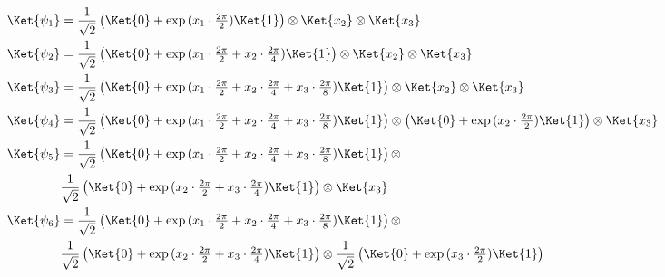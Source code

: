 \begin{align*}
    \Ket{\psi_1} & = \frac{1}{\sqrt{2}}\begin{pmatrix}\Ket{0} + \exp{(x_1\cdot\frac{2\pi}{2})}\Ket{1}\end{pmatrix} \otimes \Ket{x_2} \otimes \Ket{x_3}
    \\
    \Ket{\psi_2} & =  \frac{1}{\sqrt{2}}\begin{pmatrix}\Ket{0} + \exp{(x_1\cdot\frac{2\pi}{2} + x_2\cdot\frac{2\pi}{4})}\Ket{1}\end{pmatrix} \otimes \Ket{x_2} \otimes \Ket{x_3}
    \\
    \Ket{\psi_3} & =  \frac{1}{\sqrt{2}}\begin{pmatrix}\Ket{0} + \exp{(x_1\cdot\frac{2\pi}{2} + x_2\cdot\frac{2\pi}{4} + x_3\cdot\frac{2\pi}{8})}\Ket{1}\end{pmatrix} \otimes \Ket{x_2} \otimes \Ket{x_3}                                                                            \\
    \Ket{\psi_4} & =  \frac{1}{\sqrt{2}}\begin{pmatrix}\Ket{0} + \exp{(x_1\cdot\frac{2\pi}{2} + x_2\cdot\frac{2\pi}{4} + x_3\cdot\frac{2\pi}{8})}\Ket{1}\end{pmatrix}  \otimes \begin{pmatrix}\Ket{0} + \exp{(x_2\cdot\frac{2\pi}{2})}\Ket{1}\end{pmatrix} \otimes \Ket{x_3}
    \\
    \Ket{\psi_5} & =  \frac{1}{\sqrt{2}}\begin{pmatrix}\Ket{0} + \exp{(x_1\cdot\frac{2\pi}{2} + x_2\cdot\frac{2\pi}{4} + x_3\cdot\frac{2\pi}{8})}\Ket{1}\end{pmatrix} \otimes                                                                                                        \\ & \frac{1}{\sqrt{2}}\begin{pmatrix}\Ket{0} + \exp{(x_2\cdot\frac{2\pi}{2} + x_3\cdot\frac{2\pi}{4})}\Ket{1}\end{pmatrix} \otimes \Ket{x_3}
    \\
    \Ket{\psi_6} & =  \frac{1}{\sqrt{2}}\begin{pmatrix}\Ket{0} + \exp{(x_1\cdot\frac{2\pi}{2} + x_2\cdot\frac{2\pi}{4} + x_3\cdot\frac{2\pi}{8})}\Ket{1}\end{pmatrix} \otimes                                                                                                        \\ & \frac{1}{\sqrt{2}}\begin{pmatrix}\Ket{0} + \exp{(x_2\cdot\frac{2\pi}{2} + x_3\cdot\frac{2\pi}{4})}\Ket{1}\end{pmatrix} \otimes \frac{1}{\sqrt{2}}\begin{pmatrix}\Ket{0} + \exp{(x_3\cdot\frac{2\pi}{2})}\Ket{1}\end{pmatrix}
\end{align*}


